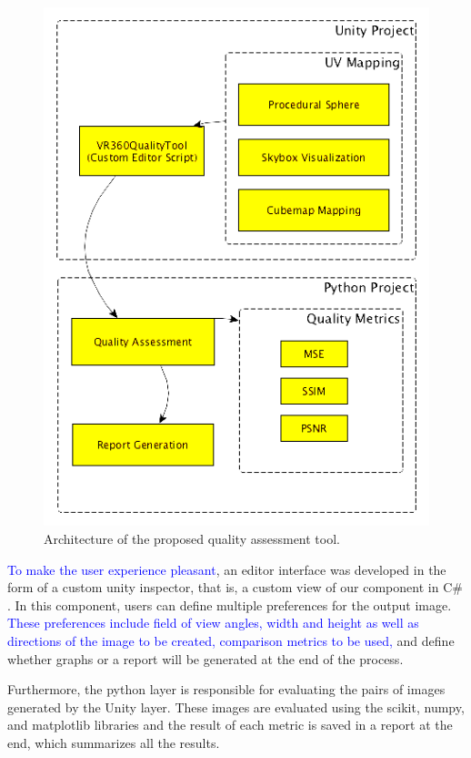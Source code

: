 \documentclass[10pt,conference]{IEEEtran}
\begin{document}
\begin{figure}[h!]
    \centering
        \includegraphics[width=0.9\linewidth]{tool_arch_en_edit.png}%
    \caption{Architecture of the proposed quality assessment tool.}
    \label{fig:fig_architecture}
\end{figure}

\textcolor{blue}{To make the user experience pleasant}, an editor interface was developed in the form of a custom unity inspector, that is, a custom view of our component in C$\#$. In this component, users can define multiple preferences for the output image. \textcolor{blue}{ These preferences include field of view angles, width and height as well as directions of the image to be created, comparison metrics to be used,} and define whether graphs or a report will be generated at the end of the process. \par

Furthermore, the python layer is responsible for evaluating the pairs of images generated by the Unity layer. These images are evaluated using the scikit, numpy, and matplotlib
libraries and the result of each metric is saved in a report at the end, which summarizes all the results.
\end{document}
